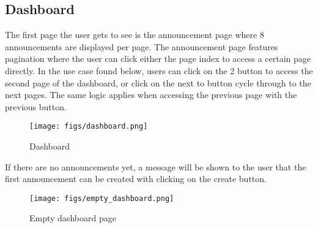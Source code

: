 \documentclass[conference]{IEEEtran}
\begin{document}
\subsection{Dashboard}
The first page the user gets to see is the announcement page where 8 announcements are displayed per page. The announcement page features pagination where the user can click either the page index to access a certain page directly. In the use case found below, users can click on the 2 button to access the second page of the dashboard, or click on the next to button cycle through to the next pages. The same logic applies when accessing the previous page with the previous button.
\begin{figure}[H]
\centering
\texttt{[image: figs/dashboard.png]}
\caption{Dashboard}
\label{fig:Dashboard}
\end{figure}
If there are no announcements yet, a message will be shown to the user that the first announcement can be created with clicking on the create button.
\begin{figure}[H]
\centering
\texttt{[image: figs/empty\_dashboard.png]}
\caption{Empty dashboard page}
\label{fig:Empty dashboard page}
\end{figure}
\end{document}
